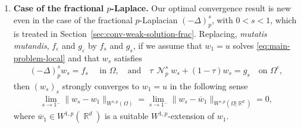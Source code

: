 \documentclass[12pt, reqno]{amsart}%
\theoremstyle{plain}  %
\theoremstyle{definition}  %
\numberwithin{equation}{section}
\DeclareMathOperator{\cN}{\mathcal{N}}
\DeclareMathOperator{\R}{\mathbb{R}}
\newcommand{\eps}{\varepsilon}
\newcommand{\WnuOmRa}{W^p_{\nu_\eps}(\Omega|\R^d )}
\newcommand{\WnuOma}{W^{p}_{\nu_\eps}(\Omega)}
\begin{document}
\begin{enumerate}[$(A)$]
\item \textbf{Case of the fractional $p$-Laplace.}
Our optimal convergence result is new even in the case of the fractional $p$-Laplacian $(-\Delta)^s_p$, with $0 < s < 1$, which is treated in Section~\ref{sec:conv-weak-solution-frac}.  Replacing, \emph{mutatis mutandis}, $f_\eps$ and $g_\eps$ by $f_s$ and $g_s$, if we assume that $w_1 = u$ solves \eqref{eq:main-problem-local} and that $w_s$ satisfies
\begin{align}\label{eq:main-fract}
(-\Delta)^s_p w_s = f_s \quad \text{ in } \Omega, \quad\text{and}\quad
\tau \,\cN_p^s w_s + (1-\tau) w_s = g_s \quad \text{on } \Omega^c,
\end{align}
then $(w_s)_s$ strongly converges to $w_1=u$ in the following sense
\begin{align*}
\lim_{s\to1^-}\|w_s -w_1\|_{W^{s,p}(\Omega)} = \lim_{s\to1^-}\|w_s- \overline{w}_1\|_{W^{s,p}(\Omega|\R^d)}=0,
\end{align*}
where $\overline{w}_1\in W^{1,p}(\R^d)$ is a suitable  $W^{1,p}$-extension of $w_1$.
\end{enumerate}

\end{document}
